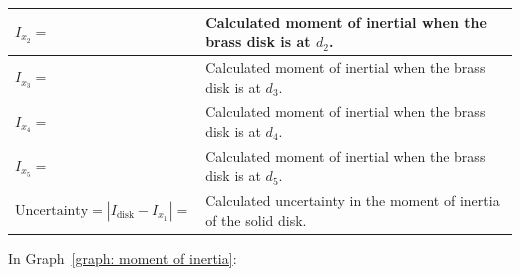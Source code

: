 \documentclass[addpoints]{physlabs}
\begin{document}
\begin{postlab}
\begin{center}
\begin{tabular}{|p{8cm}|p{7cm}|}
    $I_{x_2}=$                                   & Calculated moment of inertial when the brass disk is at $d_2$.                                                                     \\
    \hline
    $I_{x_3}=$                                   & Calculated moment of inertial when the brass disk is at $d_3$.                                                                     \\
    \hline
    $I_{x_4}=$                                   & Calculated moment of inertial when the brass disk is at $d_4$.                                                                     \\
    \hline
    $I_{x_5}=$                                   & Calculated moment of inertial when the brass disk is at $d_5$.                                                                     \\
    \hline
    $\text{Uncertainty}=|I_\text{disk}-I_{x_1}|=$ & Calculated uncertainty in the moment of inertia of the solid disk.
    \\
    \hline
    \end{tabular}
    \renewcommand{\arraystretch}{1}
    \end{center}

    \filbreak
    \question In Graph~\ref{graph: moment of inertia}:


\end{postlab}
\end{document}
